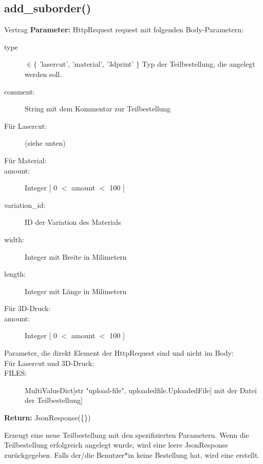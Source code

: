 \documentclass[12pt]{article}
\newcommand{\insetContract}{12pt}
\newcommand{\insetMethodDescription}{-0.7cm}
\begin{document}
\subsection{add_suborder()}
\begin{contract}{Vertrag}
    \textbf{Parameter:} HttpRequest request mit folgenden Body-Parametern:
    \begin{description}
        \item[\hspace{\insetContract} type] $\in \{$ 'lasercut', 'material', '3dprint' $\}$ Typ der Teilbestellung, die angelegt werden soll.
        \item[\hspace{\insetContract} comment:] String mit dem Kommentar zur Teilbestellung
        \item[Für Lasercut:] (siehe unten)
        \item[Für Material:]
        \item[\hspace{\insetContract} amount:] Integer $[$ 0 $<$ amount $<$ 100 $]$
        \item[\hspace{\insetContract} variation_id:] ID der Variation des Materials
        \item[\hspace{\insetContract} width:] Integer mit Breite in Milimetern
        \item[\hspace{\insetContract} length:] Integer mit Länge in Milimetern
        \item[Für 3D-Druck:]
        \item[\hspace{\insetContract} amount:]  Integer $[$ 0 $<$ amount $<$ 100 $]$
        \item[] 
        \item[Parameter, die direkt Element der HttpRequest sind und nicht im Body:]
        \item[Für Lasercut und 3D-Druck:]
        \item[\hspace{\insetContract} FILES:] MultiValueDict[str "upload-file", uploadedfile.UploadedFile] mit der Datei der Teilbestellung] 
    \end{description}
    \textbf{Return:} JsonResponse(\{\})
\end{contract}
\hspace{\insetMethodDescription{}}
Erzeugt eine neue Teilbestellung mit den spezifizierten Parametern. Wenn die Teilbestellung erfolgreich angelegt wurde, wird eine leere JsonResponse zurückgegeben.
Falls der/die Benutzer*in keine Bestellung hat, wird eine erstellt.
\end{document}
